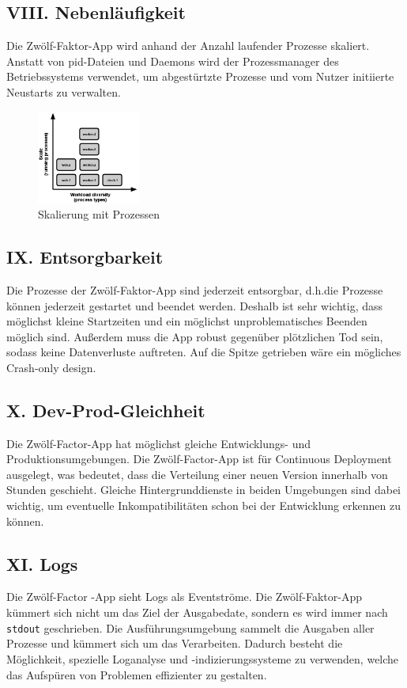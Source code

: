 \documentclass[fleqn,10pt]{SelfArx} %
\begin{document}
\subsection{VIII. Nebenläufigkeit}
Die Zwölf-Faktor-App wird anhand der Anzahl laufender Prozesse skaliert. Anstatt von pid-Dateien und Daemons wird der Prozessmanager des Betriebssystems verwendet, um abgestürtzte Prozesse und vom Nutzer initiierte Neustarts zu verwalten.
\begin{figure}[htpb]
	\centering
	\includegraphics[width=0.3\textwidth]{../process-types.png}
	\caption{Skalierung mit Prozessen~\cite{factor-concurrency}}
\end{figure}
\subsection{IX. Entsorgbarkeit}
Die Prozesse der Zwölf-Faktor-App sind jederzeit entsorgbar, d.h.\@ die Prozesse können jederzeit gestartet und beendet werden. Deshalb ist sehr wichtig, dass möglichst kleine Startzeiten und ein möglichst unproblematisches Beenden möglich sind. Außerdem muss die App robust gegenüber plötzlichen Tod sein, sodass keine Datenverluste auftreten. Auf die Spitze getrieben wäre ein mögliches Crash-only design.
\subsection{X. Dev-Prod-Gleichheit}
Die Zwölf-Factor-App hat möglichst gleiche Entwicklungs- und Produktionsumgebungen. Die Zwölf-Factor-App ist für Continuous Deployment ausgelegt, was bedeutet, dass die Verteilung einer neuen Version innerhalb von Stunden geschieht. Gleiche Hintergrunddienste in beiden Umgebungen sind dabei wichtig, um eventuelle Inkompatibilitäten schon bei der Entwicklung erkennen zu können.
\subsection{XI. Logs}
Die Zwölf-Factor -App sieht Logs als Eventströme. Die Zwölf-Faktor-App kümmert sich nicht um das Ziel der Ausgabedate, sondern es wird immer nach \texttt{stdout} geschrieben. Die Ausführungsumgebung sammelt die Ausgaben aller Prozesse und kümmert sich um das Verarbeiten. Dadurch besteht die Möglichkeit, spezielle Loganalyse und -indizierungssysteme zu verwenden, welche das Aufspüren von Problemen effizienter zu gestalten.
\end{document}
